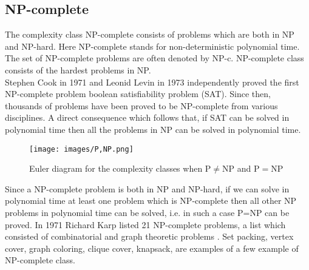 \subsection{NP-complete}
\noindent
The complexity class NP-complete consists of problems which are both in NP and NP-hard. Here NP-complete stands for non-deterministic polynomial time. The set of NP-complete problems are often denoted by NP-c. NP-complete class consists of the hardest problems in NP. \\
\noindent
Stephen Cook in 1971 and Leonid Levin in 1973 independently proved the first NP-complete problem boolean satisfiability problem (SAT). Since then, thousands of problems have been proved to be NP-complete from various disciplines. A direct consequence which follows that, if SAT can be solved in polynomial time then all the problems in NP can be solved in polynomial time.
\begin{figure}[H]
\centering
\texttt{[image: images/P,NP.png]}
    \caption{Euler diagram for the complexity classes when P$\neq$NP and P$=$NP}
\end{figure}
\noindent 
Since a NP-complete problem is both in NP and NP-hard, if we can solve in polynomial time at least one problem which is NP-complete then all other NP problems in polynomial time can be solved, i.e. in such a case P=NP can be proved. In 1971 Richard Karp listed 21 NP-complete problems, a list which consisted of combinatorial and graph theoretic problems \cite{Karp}. Set packing, vertex cover, graph coloring, clique cover, knapsack, are examples of a few example of NP-complete class.
